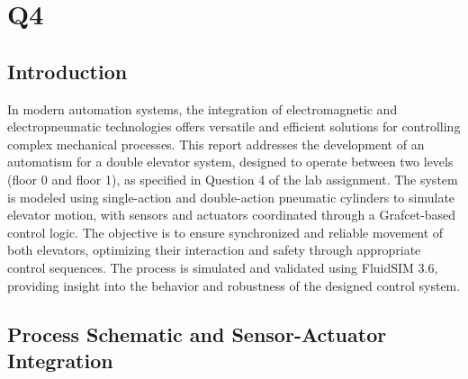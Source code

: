 \section{Q4} 

\subsection{Introduction} \label{sec:Introduction}

In modern automation systems, the integration of electromagnetic and electropneumatic technologies offers versatile 
and efficient solutions for controlling complex mechanical processes. This report addresses the development 
of an automatism for a double elevator system, designed to operate between two levels (floor 0 and floor 1),
as specified in Question 4 of the lab assignment. The system is modeled using single-action and double-action 
pneumatic cylinders to simulate elevator motion, with sensors and actuators coordinated through a Grafcet-based 
control logic. The objective is to ensure synchronized and reliable movement of both elevators, optimizing their 
interaction and safety through appropriate control sequences. The process is simulated and validated using FluidSIM 
3.6, providing insight into the behavior and robustness of the designed control system.

\subsection{Process Schematic and Sensor-Actuator Integration} \label{sec:Process_Schematic_and_Sensor-Actuator_Integration}

